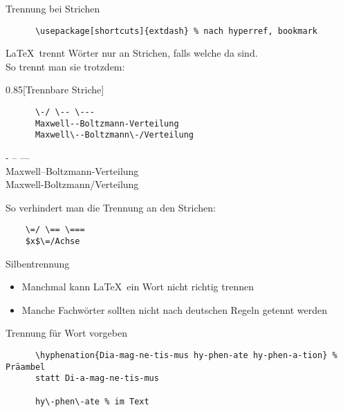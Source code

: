 \begin{frame}[fragile]{
  Trennung bei Strichen \hfill
}
  \begin{Packages}
    \begin{lstlisting}
      \usepackage[shortcuts]{extdash} % nach hyperref, bookmark
    \end{lstlisting}
  \end{Packages}

  \LaTeX\ trennt Wörter nur an Strichen, falls welche da sind.\\
  So trennt man sie trotzdem:
  \vspace{-0.5em}
  \begin{CodeExample}{0.85}[Trennbare Striche]
    \begin{lstlisting}
      \-/ \-- \---
      Maxwell--Boltzmann-Verteilung
      Maxwell\--Boltzmann\-/Verteilung
    \end{lstlisting}
  \CodeResult
    - -- --- \\
    Maxwell--Boltzmann-Verteilung \\
    Maxwell\--Boltzmann\-/Verteilung
  \end{CodeExample}

  \vspace{-7em}
  So verhindert man die Trennung an den Strichen:
  \begin{lstlisting}
    \=/ \== \===
    $x$\=/Achse
  \end{lstlisting}
\end{frame}

\begin{frame}[fragile]{Silbentrennung}
  \begin{itemize}
    \item Manchmal kann \LaTeX\ ein Wort nicht richtig trennen
    \item Manche Fachwörter sollten nicht nach deutschen Regeln getennt werden
  \end{itemize}
  \begin{block}{Trennung für Wort vorgeben}
    \begin{lstlisting}
      \hyphenation{Dia-mag-ne-tis-mus hy-phen-ate hy-phen-a-tion} % Präambel
      statt Di-a-mag-ne-tis-mus

      hy\-phen\-ate % im Text
    \end{lstlisting}
  \end{block}
\end{frame}
